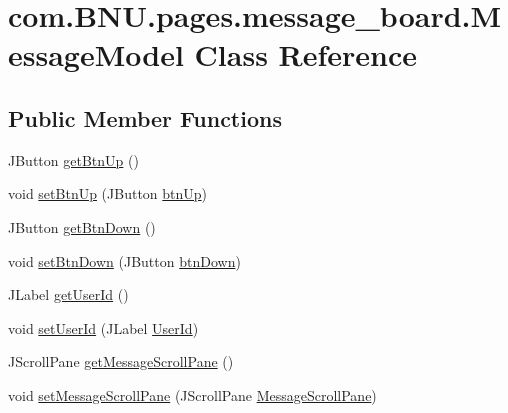 \hypertarget{classcom_1_1_b_n_u_1_1pages_1_1message__board_1_1_message_model}{}\section{com.\+B\+N\+U.\+pages.\+message\+\_\+board.\+Message\+Model Class Reference}
\label{classcom_1_1_b_n_u_1_1pages_1_1message__board_1_1_message_model}
\subsection*{Public Member Functions}
\begin{DoxyCompactItemize}
\item 
J\+Button \mbox{\hyperlink{classcom_1_1_b_n_u_1_1pages_1_1message__board_1_1_message_model_ad6ce8765248550ddef331a101a6a366a}{get\+Btn\+Up}} ()
\item 
void \mbox{\hyperlink{classcom_1_1_b_n_u_1_1pages_1_1message__board_1_1_message_model_a8d61b416e7afe2947b36df4f77d7c1c5}{set\+Btn\+Up}} (J\+Button \mbox{\hyperlink{classcom_1_1_b_n_u_1_1pages_1_1message__board_1_1_message_model_a4c6514b5de48a3921398615daf179550}{btn\+Up}})
\item 
J\+Button \mbox{\hyperlink{classcom_1_1_b_n_u_1_1pages_1_1message__board_1_1_message_model_afc49a49a7ae4b339a4c2850d7291ed9c}{get\+Btn\+Down}} ()
\item 
void \mbox{\hyperlink{classcom_1_1_b_n_u_1_1pages_1_1message__board_1_1_message_model_a23d2637e6b4f00d3eef8df5ff5a70236}{set\+Btn\+Down}} (J\+Button \mbox{\hyperlink{classcom_1_1_b_n_u_1_1pages_1_1message__board_1_1_message_model_a71141955061669383af5642357fc723f}{btn\+Down}})
\item 
J\+Label \mbox{\hyperlink{classcom_1_1_b_n_u_1_1pages_1_1message__board_1_1_message_model_adae0e4f628e316c484db3a3e321ca4e8}{get\+User\+Id}} ()
\item 
void \mbox{\hyperlink{classcom_1_1_b_n_u_1_1pages_1_1message__board_1_1_message_model_aef3c5dea1e74d119e5487523778b4a18}{set\+User\+Id}} (J\+Label \mbox{\hyperlink{classcom_1_1_b_n_u_1_1pages_1_1message__board_1_1_message_model_a29f9c399689c1c0278557b512d8a28c9}{User\+Id}})
\item 
J\+Scroll\+Pane \mbox{\hyperlink{classcom_1_1_b_n_u_1_1pages_1_1message__board_1_1_message_model_aa64cd226dfcd9a76542b4749daf7f1f9}{get\+Message\+Scroll\+Pane}} ()
\item 
void \mbox{\hyperlink{classcom_1_1_b_n_u_1_1pages_1_1message__board_1_1_message_model_a98e7b4ac1ac8638a3ff211a78d92a059}{set\+Message\+Scroll\+Pane}} (J\+Scroll\+Pane \mbox{\hyperlink{classcom_1_1_b_n_u_1_1pages_1_1message__board_1_1_message_model_af1f911b0f9cde5631ed6f83d9097bc19}{Message\+Scroll\+Pane}})

\end{DoxyCompactItemize}
